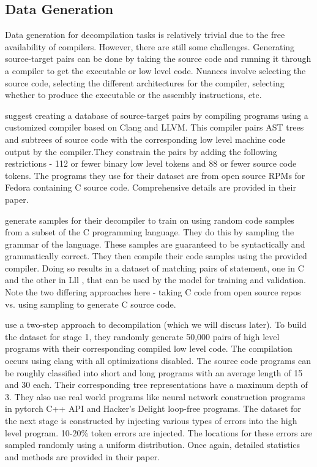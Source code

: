 \documentclass{article}
\begin{document}
\subsection{Data Generation}
Data generation for decompilation tasks is relatively trivial due to the free availability of compilers. However, there are still some challenges. Generating source-target pairs can be done by taking the source code and running it through a compiler to get the executable or low level code. Nuances involve selecting the source code, selecting the different architectures for the compiler, selecting whether to produce the executable or the assembly instructions, etc. 

\citet{katz2018using} suggest creating a database of source-target pairs by compiling programs using a customized compiler based on Clang and LLVM. This compiler pairs AST trees and subtrees of source code with the corresponding low level machine code output by the compiler.They constrain the pairs by adding the following restrictions - 112 or fewer binary low level tokens and 88 or fewer source code tokens. The programs they use for their dataset are from open source RPMs for Fedora containing C source code. Comprehensive details are provided in their paper.

\citet{katz2019towards} generate samples for their decompiler to train on using random code samples from a subset of the C programming language. They do this by sampling the grammar of the language. These samples are guaranteed to be syntactically and grammatically correct. They then compile their code samples using the provided compiler. Doing so results in a dataset of matching pairs of statement, one in C and the other in Lll , that can be used by the model for training and validation. Note the two differing approaches here - taking C code from open source repos vs. using sampling to generate C source code. 

\citet{coda} use a two-step approach to decompilation (which we will discuss later). To build the dataset for stage 1, they randomly generate 50,000 pairs of high level programs with their corresponding compiled low level code. The compilation occurs using clang with all optimizations disabled. The source code programs can be roughly classified into short and long programs with an average length of 15 and 30 each. Their corresponding tree representations have a maximum depth of 3. They also use real world programs like neural network construction programs in pytorch C++ API and Hacker’s Delight loop-free programs. The dataset for the next stage is constructed by injecting various types of errors into the high level program. 10-20\% token errors are injected. The locations for these errors are sampled randomly using a uniform distribution. Once again, detailed statistics and methods are provided in their paper.
\end{document}
